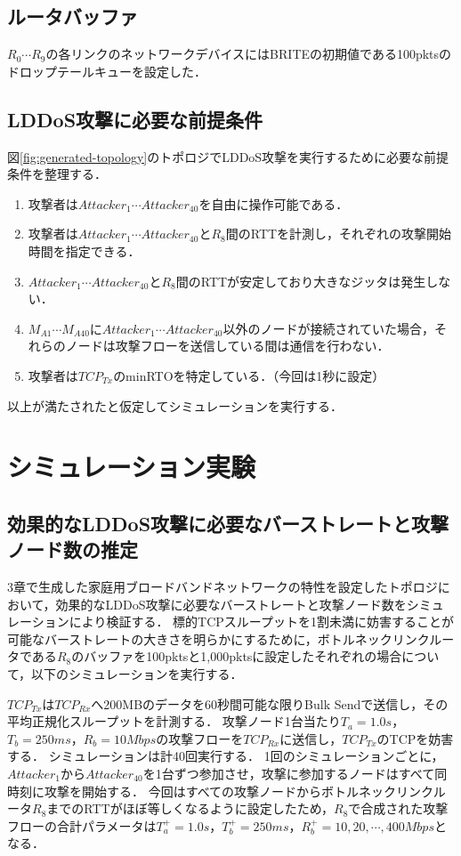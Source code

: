 \documentclass[Japanese]{dicomopapers}
\begin{document}
\subsection{ルータバッファ}
$R_{0} \cdots R_{9}$の各リンクのネットワークデバイスにはBRITEの初期値である100pktsのドロップテールキューを設定した．

\subsection{LDDoS攻撃に必要な前提条件}
図\ref{fig:generated-topology}のトポロジでLDDoS攻撃を実行するために必要な前提条件を整理する．

\begin{enumerate}
    \item 攻撃者は$Attacker_{1} \cdots Attacker_{40}$を自由に操作可能である．
    \item 攻撃者は$Attacker_{1} \cdots Attacker_{40}$と$R_{8}$間のRTTを計測し，それぞれの攻撃開始時間を指定できる．
    \item $Attacker_{1} \cdots Attacker_{40}$と$R_{8}$間のRTTが安定しており大きなジッタは発生しない．
    \item $M_{A1} \cdots M_{A40}$に$Attacker_{1} \cdots Attacker_{40}$以外のノードが接続されていた場合，それらのノードは攻撃フローを送信している間は通信を行わない．
    \item 攻撃者は$TCP_{Tx}$のminRTOを特定している．（今回は1秒に設定）
\end{enumerate}

以上が満たされたと仮定してシミュレーションを実行する．

\section{シミュレーション実験}
\subsection{効果的なLDDoS攻撃に必要なバーストレートと攻撃ノード数の推定}
3章で生成した家庭用ブロードバンドネットワークの特性を設定したトポロジにおいて，効果的なLDDoS攻撃に必要なバーストレートと攻撃ノード数をシミュレーションにより検証する．
標的TCPスループットを1割未満に妨害することが可能なバーストレートの大きさを明らかにするために，ボトルネックリンクルータである$R_{8}$のバッファを100pktsと1,000pktsに設定したそれぞれの場合について，以下のシミュレーションを実行する．

$TCP_{Tx}$は$TCP_{Rx}$へ200MBのデータを60秒間可能な限りBulk Sendで送信し，その平均正規化スループットを計測する．
攻撃ノード1台当たり$T_{a} = 1.0s$，$T_{b} = 250ms$，$R_{b}=10Mbps$の攻撃フローを$TCP_{Rx}$に送信し，$TCP_{Tx}$のTCPを妨害する．
シミュレーションは計40回実行する．
1回のシミュレーションごとに，$Attacker_{1}$から$Attacker_{40}$を1台ずつ参加させ，攻撃に参加するノードはすべて同時刻に攻撃を開始する．
今回はすべての攻撃ノードからボトルネックリンクルータ$R_{8}$までのRTTがほぼ等しくなるように設定したため，$R_{8}$で合成された攻撃フローの合計パラメータは$T_{a}^+ = 1.0s$，$T_{b}^+ = 250ms$，$R_{b}^+=10, 20, \cdots, 400Mbps$となる．
\end{document}
